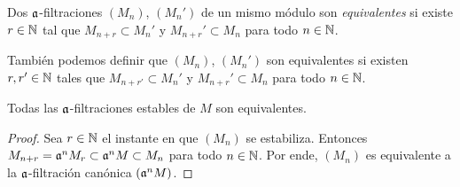 \begin{definition}
Dos $\mathfrak a$-filtraciones $(M_n)$, $(M_n')$ de un mismo módulo son \textit{equivalentes} si existe $r \in \mathbb N$ tal que $M_{n+r} \subset M_n'$ y $M_{n+r}' \subset M_n$ para todo $n \in \mathbb N$.
\end{definition}

\begin{remark}
También podemos definir que $(M_n)$, $(M_n')$ son equivalentes si existen $r, r' \in \mathbb N$ tales que $M_{n+r'} \subset M_n'$ y $M_{n+r}' \subset M_n$ para todo $n \in \mathbb N$.
\end{remark}

\begin{proposition}
Todas las $\mathfrak a$-filtraciones estables de $M$ son equivalentes.
\end{proposition}

\begin{proof}
Sea $r \in \mathbb N$ el instante en que $(M_n)$ se estabiliza. Entonces $M_{n+r} = \mathfrak a^n M_r \subset \mathfrak a^n M \subset M_n$ para todo $n \in \mathbb N$. Por ende, $(M_n)$ es equivalente a la $\mathfrak a$-filtración canónica $(\mathfrak a^n M)$.
\end{proof}
